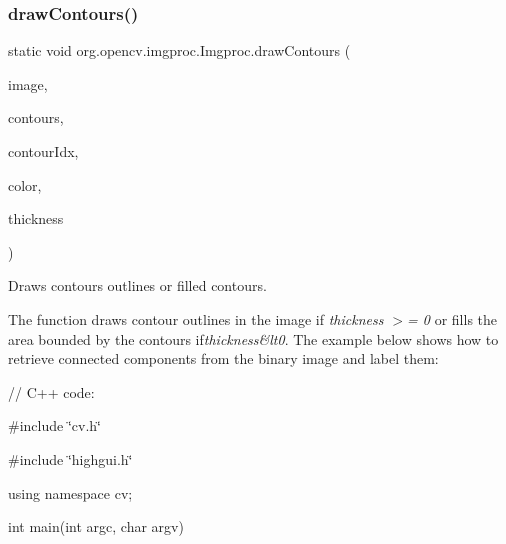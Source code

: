 \subsubsection{\texorpdfstring{draw\+Contours()}{drawContours()}\hspace{0.1cm}{\footnotesize\ttfamily [2/3]}}
{\footnotesize\ttfamily static void org.\+opencv.\+imgproc.\+Imgproc.\+draw\+Contours (\begin{DoxyParamCaption}\item[{\mbox{\hyperlink{classorg_1_1opencv_1_1core_1_1_mat}{Mat}}}]{image,  }\item[{List$<$ \mbox{\hyperlink{classorg_1_1opencv_1_1core_1_1_mat_of_point}{Mat\+Of\+Point}} $>$}]{contours,  }\item[{int}]{contour\+Idx,  }\item[{\mbox{\hyperlink{classorg_1_1opencv_1_1core_1_1_scalar}{Scalar}}}]{color,  }\item[{int}]{thickness }\end{DoxyParamCaption})\hspace{0.3cm}{\ttfamily [static]}}

Draws contours outlines or filled contours.

The function draws contour outlines in the image if {\itshape thickness $>$= 0} or fills the area bounded by the contours if{\itshape thickness\&lt0}. The example below shows how to retrieve connected components from the binary image and label them\+: {\ttfamily }

{\ttfamily }

{\ttfamily }

{\ttfamily // C++ code\+:}

{\ttfamily }

{\ttfamily }

{\ttfamily \#include \char`\"{}cv.\+h\char`\"{}}

{\ttfamily }

{\ttfamily }

{\ttfamily \#include \char`\"{}highgui.\+h\char`\"{}}

{\ttfamily }

{\ttfamily }

{\ttfamily using namespace cv;}

{\ttfamily }

{\ttfamily }

{\ttfamily int main(int argc, char argv)}

{\ttfamily }

{\ttfamily }

